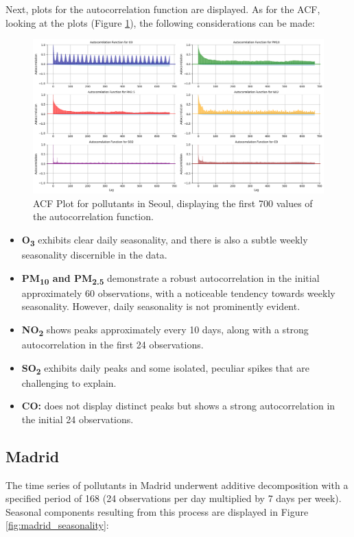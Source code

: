 Next, plots for the autocorrelation function are displayed. As for the ACF, looking at the plots (Figure \ref{fig:acfplot_seoul}), the following considerations can be made:

\begin{figure}[h]
    \centering
    \includegraphics[width=1\linewidth]{images/acfplot_seoul.png}
    \caption{ACF Plot for pollutants in Seoul, displaying the first 700 values of the autocorrelation function.}
    \label{fig:acfplot_seoul}
\end{figure}

\begin{itemize}
    \item \textbf{O\textsubscript{3}} exhibits clear daily seasonality, and there is also a subtle weekly seasonality discernible in the data.
    \item \textbf{PM\textsubscript{10} and PM\textsubscript{2.5}} demonstrate a robust autocorrelation in the initial approximately 60 observations, with a noticeable tendency towards weekly seasonality. However, daily seasonality is not prominently evident.
    \item \textbf{NO\textsubscript{2}} shows peaks approximately every 10 days, along with a strong autocorrelation in the first 24 observations.
    \item \textbf{SO\textsubscript{2}} exhibits daily peaks and some isolated, peculiar spikes that are challenging to explain.
    \item \textbf{CO:} does not display distinct peaks but shows a strong autocorrelation in the initial 24 observations.
\end{itemize}

\subsection{Madrid}
The time series of pollutants in Madrid underwent additive decomposition with a specified period of 168 (24 observations per day multiplied by 7 days per week). Seasonal components resulting from this process are displayed in Figure \ref{fig:madrid_seasonality}:

